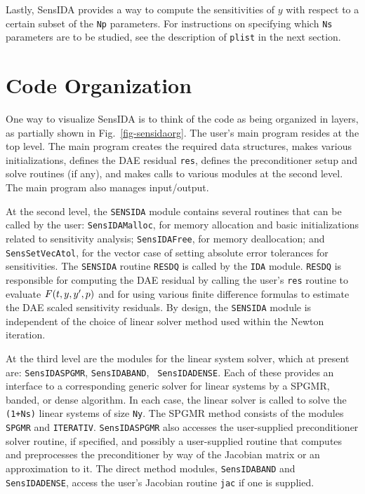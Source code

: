 Lastly, SensIDA provides a way to compute the sensitivities of $y$
with respect to a certain subset of the {\tt Np} parameters.
For instructions on specifying which {\tt Ns} parameters are to be studied,
see the description of {\tt plist} in the next section.

\section{Code Organization}

One way to visualize SensIDA is to think of the code as being
organized in layers, as partially shown in Fig.~\ref{fig-sensidaorg}.
The user's main program resides at the top level.
The main program creates the required data structures, makes various
initializations, defines the DAE residual {\tt res}, defines the
preconditioner setup and solve routines (if any), and makes calls to
various modules at the second level. The main program also manages
input/output.

At the second level, the {\tt SENSIDA} module contains several routines
that can be called by the user: {\tt SensIDAMalloc}, for memory allocation
and basic initializations related to sensitivity analysis; 
{\tt SensIDAFree}, for memory deallocation; and {\tt SensSetVecAtol},
for the vector case of setting absolute error tolerances for
sensitivities.
The {\tt SENSIDA} routine {\tt RESDQ} is called by the {\tt IDA}
module.
{\tt RESDQ} is responsible for computing the DAE residual by
calling the user's {\tt res} routine to evaluate $F(t, y, y^{\prime}, p)$
and for using various finite difference formulas to estimate the DAE
scaled sensitivity residuals.
By design, the {\tt SENSIDA} module is independent of the choice of
linear solver method used within the Newton iteration.

At the third level are the modules for the linear system solver, which
at present are: {\tt SensIDASPGMR}, {\tt SensIDABAND}, {\tt
SensIDADENSE}.
Each of these provides an interface to a corresponding generic solver
for linear systems by a SPGMR, banded, or dense algorithm.
In each case, the linear solver is called to solve the {\tt (1+Ns)}
linear systems of size {\tt Ny}. 
The SPGMR method consists of the modules {\tt SPGMR} and
{\tt ITERATIV}.
{\tt SensIDASPGMR} also accesses the user-supplied preconditioner
solver routine, if specified, and possibly a user-supplied
routine that computes and preprocesses the preconditioner by way of
the Jacobian matrix or an approximation to it.
The direct method modules, {\tt SensIDABAND} and {\tt SensIDADENSE},
access the user's Jacobian routine {\tt jac} if one is supplied.

